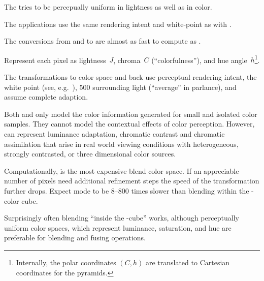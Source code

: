 \begin{description}
  The %
  tries to be percepually uniform in lightness as well as in color.

  The applications use the same rendering intent and white-point as
  with .

  The conversions from and to  are almost as fast to
  compute as .

\item[\urlmark{\wikipediaciecam}{\acronym{CIECAM02}}]\itemend\urltext
  Represent each pixel as lightness~$J$, chroma~$C$
  (``colorfulness''), and hue angle~$h$\footnote{Internally, the polar
    coordinates $(C, h)$ are translated to Cartesian coordinates for
    the pyramids.}.

  The transformations to  color
  space%
  and back use perceptual rendering intent,%
   the
  white point (see, e.g.\ ), 500 surrounding light (``average'' in
   parlance), and assume complete adaption.

  Both  and  only model the color
  information generated for small and isolated color samples.  They
  cannot model the contextual effects of color perception.  However,
   can represent luminance adaptation, chromatic
  contrast and chromatic assimilation that arise in real world viewing
  conditions with heterogeneous, strongly contrasted, or three
  dimensional color sources.

  Computationally,  is the most expensive blend
  color space.  If an appreciable number of pixels need additional
  refinement steps the speed of the transformation further drops.
  Expect  mode to be 8--800 times slower than
  blending within the -color cube.
\end{description}

\noindent Surprisingly often blending ``inside the
-cube'' works, although perceptually uniform color
spaces, which represent luminance, saturation, and hue are preferable
for blending and fusing operations.


